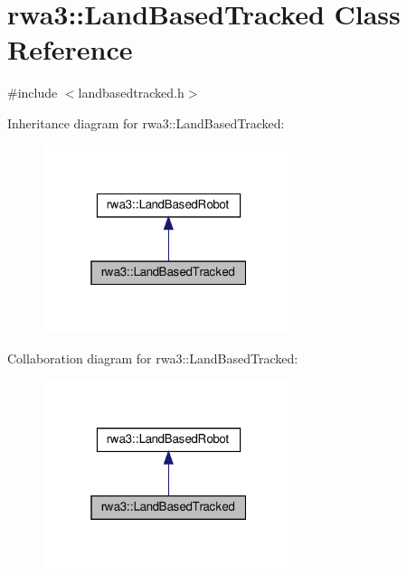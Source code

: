 \hypertarget{classrwa3_1_1_land_based_tracked}{}\section{rwa3\+:\+:Land\+Based\+Tracked Class Reference}
\label{classrwa3_1_1_land_based_tracked}


{\ttfamily \#include $<$landbasedtracked.\+h$>$}



Inheritance diagram for rwa3\+:\+:Land\+Based\+Tracked\+:\nopagebreak
\begin{figure}[H]
\begin{center}
\leavevmode
\includegraphics[width=208pt]{classrwa3_1_1_land_based_tracked__inherit__graph}
\end{center}
\end{figure}


Collaboration diagram for rwa3\+:\+:Land\+Based\+Tracked\+:\nopagebreak
\begin{figure}[H]
\begin{center}
\leavevmode
\includegraphics[width=208pt]{classrwa3_1_1_land_based_tracked__coll__graph}
\end{center}
\end{figure}
